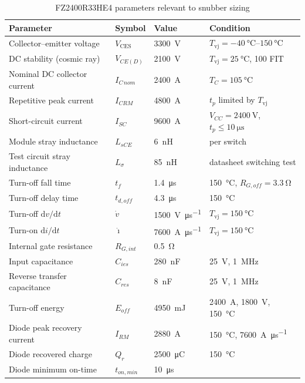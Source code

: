 \documentclass[11pt,a4paper]{article}
\newcommand{\Vces}{V_{\mathrm{CES}}}
\newcommand{\Ls}{L_{\sigma}}
\newcommand{\Tvj}{T_{\mathrm{vj}}}
\begin{document}
\begin{table}[htbp]
\centering
\caption{FZ2400R33HE4 parameters relevant to snubber sizing}
\label{tab:device}
\begin{tabular}{llll}
\toprule
Parameter & Symbol & Value & Condition \\
\midrule
Collector--emitter voltage      & $\Vces$        & \SI{3300}{\volt}   & $\Tvj = \SIrange{-40}{150}{\celsius}$ \\
DC stability (cosmic ray)       & $V_{CE(D)}$    & \SI{2100}{\volt}   & $\Tvj = \SI{25}{\celsius}$, 100 FIT \\
Nominal DC collector current    & $I_{C\,nom}$   & \SI{2400}{\ampere} & $T_C = \SI{105}{\celsius}$ \\
Repetitive peak current         & $I_{CRM}$      & \SI{4800}{\ampere} & $t_p$ limited by $\Tvj$ \\
Short-circuit current           & $I_{SC}$       & \SI{9600}{\ampere} & $V_{CC}=\SI{2400}{\volt}$, $t_p\le\SI{10}{\micro\second}$ \\
Module stray inductance         & $L_{sCE}$      & \SI{6}{\nano\henry} & per switch \\
Test circuit stray inductance   & $\Ls$          & \SI{85}{\nano\henry} & datasheet switching test \\
Turn-off fall time              & $t_f$          & \SI{1.4}{\micro\second} & \SI{150}{\celsius}, $R_{G,off}=\SI{3.3}{\ohm}$ \\
Turn-off delay time             & $t_{d,off}$    & \SI{4.3}{\micro\second} & \SI{150}{\celsius} \\
Turn-off $\mathrm{d}v/\mathrm{d}t$        & $\dot v$       & \SI{1500}{\volt\per\micro\second} & $\Tvj = \SI{150}{\celsius}$ \\
Turn-on $\mathrm{d}i/\mathrm{d}t$         & $\dot\imath$   & \SI{7600}{\ampere\per\micro\second} & $\Tvj = \SI{150}{\celsius}$ \\
Internal gate resistance        & $R_{G,int}$    & \SI{0.5}{\ohm} & \\
Input capacitance               & $C_{ies}$      & \SI{280}{\nano\farad} & \SI{25}{\volt}, \SI{1}{\mega\hertz} \\
Reverse transfer capacitance    & $C_{res}$      & \SI{8}{\nano\farad} & \SI{25}{\volt}, \SI{1}{\mega\hertz} \\
Turn-off energy                 & $E_{off}$      & \SI{4950}{\milli\joule} & \SI{2400}{\ampere}, \SI{1800}{\volt}, \SI{150}{\celsius} \\
Diode peak recovery current     & $I_{RM}$       & \SI{2880}{\ampere} & \SI{150}{\celsius}, \SI{7600}{\ampere\per\micro\second} \\
Diode recovered charge          & $Q_r$          & \SI{2500}{\micro\coulomb} & \SI{150}{\celsius} \\
Diode minimum on-time           & $t_{on,min}$   & \SI{10}{\micro\second} & \\
\bottomrule
\end{tabular}
\end{table}
\end{document}
